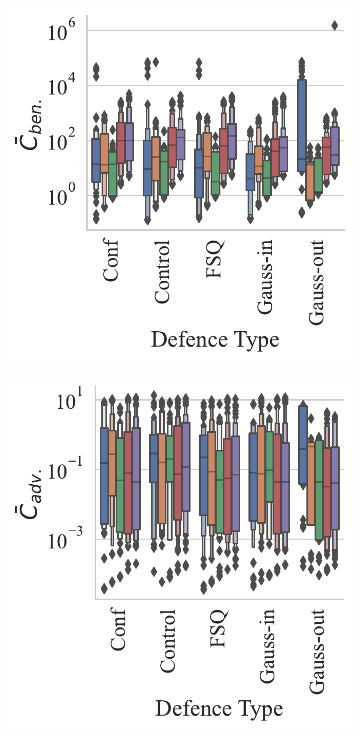\begin{figure}
    \centering
    \begin{subfigure}[]{.3\textwidth}
        \centering
        \includegraphics[width=\textwidth]{mnist/ben_failures_per_train_time_vs_defence_type.pdf}
    \end{subfigure}
    \begin{subfigure}[]{0.3\textwidth}
        \includegraphics[width=\textwidth]{mnist/adv_failures_per_train_time_vs_defence_type.pdf}

\end{subfigure}
\end{figure}
